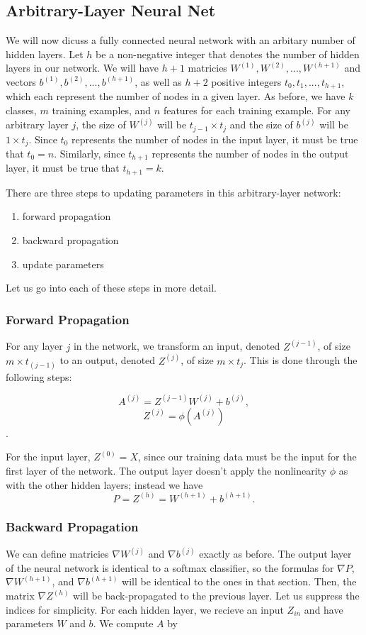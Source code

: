\subsection{Arbitrary-Layer Neural Net}
We will now dicuss a fully connected neural network with an arbitary number of
hidden layers. Let $h$ be a non-negative integer that denotes the number of
hidden layers in our network. We will have $h+1$ matricies $W^{(1)}, W^{(2)},
..., W^{(h+1)}$ and vectors $b^{(1)}, b^{(2)}, ..., b^{(h+1)}$, as well as
$h+2$ positive integers $t_0, t_1, ..., t_{h+1}$, which each represent the number
of nodes in a given layer. As before, we have $k$ classes, $m$ training
examples, and $n$ features for each training example. For any arbitrary layer
$j$, the size of $W^{(j)}$ will be $t_{j-1} \times t_j$ and the size of
$b^{(j)}$ will be $1 \times t_j$. Since $t_0$ represents the number of nodes in
the input layer, it must be true that $t_0 = n$. Similarly, since $t_{h+1}$
represents the number of nodes in the output layer, it must be true that
$t_{h+1} = k$.

There are three steps to updating parameters in this arbitrary-layer network:
\begin{enumerate}
\item forward propagation
\item backward propagation
\item update parameters
\end{enumerate}

Let us go into each of these steps in more detail.

\subsubsection{Forward Propagation}
For any layer $j$ in the network, we transform an input, denoted $Z^{(j-1)}$,
of size $m \times t_{(j-1)}$ to an output, denoted $Z^{(j)}$, of size $m \times
t_j$. This is done through the following steps:

$$ A^{(j)} = Z^{(j-1)} W^{(j)} + b^{(j)}, $$
$$ Z^{(j)} = \phi\left( A^{(j)} \right)$$.

For the input layer, $Z^{(0)} = X$, since our training data must be the input
for the first layer of the network. The output layer doesn't apply the
nonlinearity $\phi$ as with the other hidden layers; instead we have
$$ P = Z^{(h)} = W^{(h+1)} + b^{(h+1)}. $$


\subsubsection{Backward Propagation}
We can define matricies $\nabla W^{(j)}$ and $\nabla b^{(j)}$ exactly as
before. The output layer of the neural network is identical to a softmax
classifier, so the formulas for $\nabla P$, $\nabla W^{(h+1)}$, and $\nabla
b^{(h+1)}$ will be identical to the ones in that section. Then, the matrix
$\nabla Z^{(h)}$ will be back-propagated to the previous layer. Let us suppress
the indices for simplicity. For each hidden layer, we recieve an input $Z_{in}$
and have parameters $W$ and $b$. We compute $A$ by

